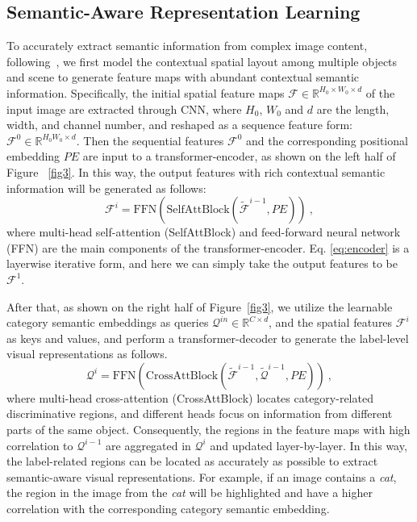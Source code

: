 \documentclass{ecai}
\begin{document}
\subsection{Semantic-Aware Representation Learning}\label{SARL}
To accurately extract semantic information from complex image content, following~\cite{dao2021multi,liu2021q2l}, we first model the contextual spatial layout among multiple objects and scene to generate feature maps with abundant contextual semantic information. Specifically, the initial spatial feature maps $\mathcal{F}\in \mathbb{R}^{H_0\times W_0\times d}$ of the input image are extracted through CNN, where $H_0$, $W_0$ and $d$ are the length, width, and channel number, and reshaped as a sequence feature form: $\mathcal{F }^0\in \mathbb{R}^{H_0 W_0\times d}$. Then the sequential features $\mathcal{F}^0$ and the corresponding positional embedding $PE$ are input to a transformer-encoder, as shown on the left half of Figure ~\ref{fig3}. In this way, the output features with rich contextual semantic information will be generated as follows:
\begin{equation}
	\mathcal{F}^i = \text{FFN} (\text{SelfAttBlock}(\widetilde{\mathcal{F}}^{i-1}, PE))~,
	\label{eq:encoder}
\end{equation}
where multi-head self-attention (SelfAttBlock) and feed-forward neural network (FFN) are the main components of the transformer-encoder. Eq. \ref{eq:encoder} is a layerwise iterative form, and here we can simply take the output features to be $\mathcal{F}^1$.

After that, as shown on the right half of Figure~\ref{fig3}, we utilize the learnable category semantic embeddings as queries $\mathcal{Q}^{in}\in \mathbb{R}^{C\times d}$, and the spatial features $\mathcal{F}^i$ as keys and values, and perform a transformer-decoder to generate the label-level visual representations as follows. 
\begin{equation}
	\mathcal{Q}^i = \text{FFN} (\text{CrossAttBlock}(\widetilde{\mathcal{F}}^{i-1}, \widetilde{\mathcal{Q}}^{i-1}, PE))~,
\end{equation}
where multi-head cross-attention (CrossAttBlock) locates category-related discriminative regions, and different heads focus on information from different parts of the same object. Consequently, the regions in the feature maps with high correlation to $\mathcal{Q}^{i-1}$ are aggregated in $\mathcal{Q}^{i}$ and updated layer-by-layer. In this way, the label-related regions can be located as accurately as possible to extract semantic-aware visual representations. For example, if an image contains a \textit{cat}, the region in the image from the \textit{cat} will be highlighted and have a higher correlation with the corresponding category semantic embedding.
\end{document}

